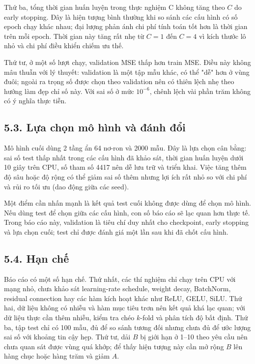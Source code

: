 \documentclass[12pt,a4paper]{article}
\begin{document}
Thứ ba, tổng thời gian huấn luyện trong thực nghiệm C không tăng theo $C$ do early stopping. Đây là hiện tượng bình thường khi so sánh các cấu hình có số epoch chạy khác nhau; đại lượng phản ánh chi phí tính toán tốt hơn là thời gian trên mỗi epoch. Thời gian này tăng rất nhẹ từ $C=1$ đến $C=4$ vì kích thước lô nhỏ và chi phí điều khiển chiếm ưu thế.

Thứ tư, ở một số lượt chạy, validation MSE thấp hơn train MSE. Điều này không mâu thuẫn với lý thuyết: validation là một tập mẫu khác, có thể "dễ" hơn ở vùng đuôi; ngoài ra trọng số được chọn theo validation nên có thiên lệch nhẹ theo hướng làm đẹp chỉ số này. Với sai số ở mức $10^{-6}$, chênh lệch vài phần trăm không có ý nghĩa thực tiễn.

\subsection{5.3. Lựa chọn mô hình và đánh đổi}

Mô hình cuối dùng 2 tầng ẩn 64 nơ-ron và 2000 mẫu. Đây là lựa chọn cân bằng: sai số test thấp nhất trong các cấu hình đã khảo sát, thời gian huấn luyện dưới 10 giây trên CPU, số tham số 4417 nên dễ lưu trữ và triển khai. Việc tăng thêm độ sâu hoặc độ rộng có thể giảm sai số thêm nhưng lợi ích rất nhỏ so với chi phí và rủi ro tối ưu (dao động giữa các seed).

Một điểm cần nhấn mạnh là kết quả test cuối không được dùng để chọn mô hình. Nếu dùng test để chọn giữa các cấu hình, con số báo cáo sẽ lạc quan hơn thực tế. Trong báo cáo này, validation là tiêu chí duy nhất cho checkpoint, early stopping và lựa chọn cuối; test chỉ được đánh giá một lần sau khi đã chốt cấu hình.

\subsection{5.4. Hạn chế}

Báo cáo có một số hạn chế. Thứ nhất, các thí nghiệm chỉ chạy trên CPU với mạng nhỏ, chưa khảo sát learning-rate schedule, weight decay, BatchNorm, residual connection hay các hàm kích hoạt khác như ReLU, GELU, SiLU. Thứ hai, dữ liệu không có nhiễu và hàm mục tiêu trơn nên kết quả khá lạc quan; với dữ liệu thực cần thêm nhiễu, kiểm tra chéo $k$-fold và phân tích độ bất định. Thứ ba, tập test chỉ có 100 mẫu, đủ để so sánh tương đối nhưng chưa đủ để ước lượng sai số với khoảng tin cậy hẹp. Thứ tư, dải $B$ bị giới hạn ở 1--10 theo yêu cầu nên chưa quan sát được vùng quá khớp; để thấy hiện tượng này cần mở rộng $B$ lên hàng chục hoặc hàng trăm và giảm $A$.
\end{document}
